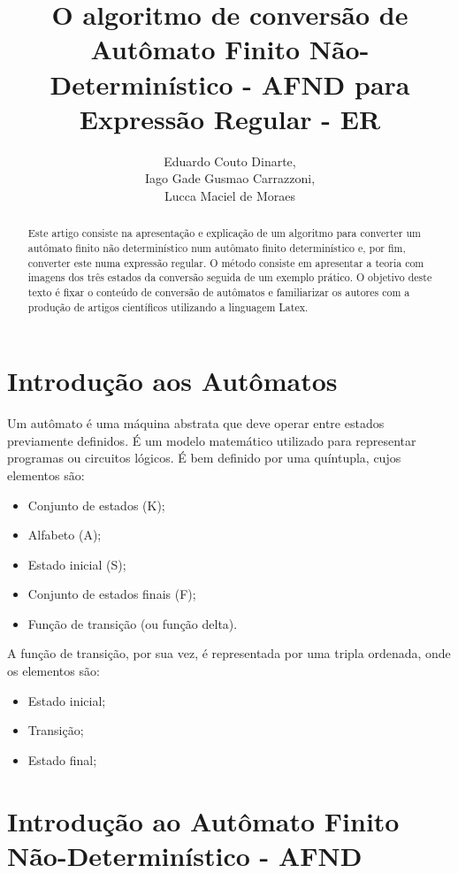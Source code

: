 \documentclass[a4paper,10pt]{article} %
\title{O algoritmo de conversão de Autômato Finito Não-Determinístico - AFND para Expressão Regular - ER}
\author{Eduardo Couto Dinarte,\\ Iago Gade Gusmao Carrazzoni,\\ Lucca Maciel de Moraes}
\begin{document}
\maketitle

\begin{abstract}

Este artigo consiste na apresenta\c{c}\~{a}o e explica\c{c}\~{a}o de um algoritmo para converter um aut\^{o}mato finito n\~{a}o determin\'{i}stico num aut\^{o}mato finito determin\'{i}stico e, por fim, converter este numa express\~{a}o regular. O m\'{e}todo consiste em apresentar a teoria com imagens dos tr\^{e}s estados da convers\~{a}o seguida de um exemplo pr\'{a}tico. O objetivo deste texto \'{e} fixar o conte\'{u}do de convers\~{a}o de aut\^{o}matos e familiarizar os autores com a produ\c{c}\~{a}o de artigos cient\'{i}ficos utilizando a linguagem Latex.

\end{abstract}

\newpage
\section{Introdução aos Autômatos}

Um autômato é uma máquina abstrata que deve operar entre estados previamente definidos. É um modelo matemático utilizado para representar programas ou circuitos lógicos. É bem definido por uma quíntupla, cujos elementos são:
    \begin{itemize}
        \item Conjunto de estados (K);
        \item Alfabeto (A);
        \item Estado inicial (S);
        \item Conjunto de estados finais (F);
        \item Função de transição (ou função delta).
    \end{itemize}

A função de transição, por sua vez, é representada por uma tripla ordenada, onde os elementos são:
    \begin{itemize}
        \item Estado inicial;
        \item Transição;
        \item Estado final;
    \end{itemize}

\newpage
\section{Introdução ao Autômato Finito Não-Determinístico - AFND}
\end{document}

